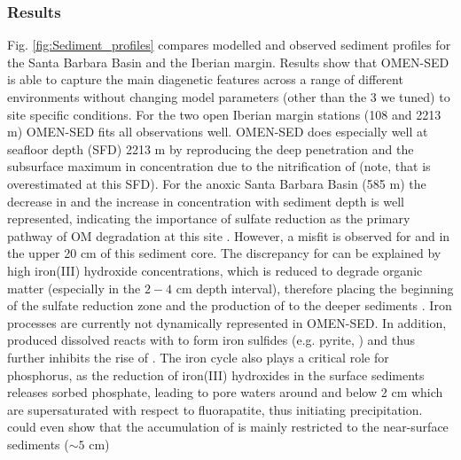 \documentclass[gmd, manuscript]{copernicus}
\begin{document}
\subsubsection{Results}
Fig. \ref{fig:Sediment_profiles} compares modelled and observed sediment profiles for the Santa Barbara Basin and the Iberian margin. Results show 
that OMEN-SED is able to capture the main diagenetic features across a range of different environments without changing model parameters (other than the 3 we tuned) %
to site specific conditions. 
For the two open Iberian margin stations (108 and 2213 m) OMEN-SED fits all observations well. OMEN-SED does especially well at seafloor depth (SFD) 2213 m by reproducing the deep  penetration and the subsurface maximum in  
concentration due to the nitrification of  (note, that  is overestimated at this SFD). 
For the anoxic Santa Barbara Basin (585 m) the decrease in  and the increase in  concentration with sediment depth is well represented, indicating the 
importance of sulfate reduction as the primary pathway of OM degradation at this site \citep[compare with][]{meysman_reactive_2003}. 
However, a misfit is observed for  and  in the upper 20 cm of this sediment core. The discrepancy for  can be explained by high iron(III) hydroxide concentrations, 
which is reduced to degrade organic matter (especially in the $2-4$ cm depth interval), therefore placing the beginning of the sulfate reduction zone and the production of  to the deeper sediments \citep{reimers_porewater_1996}. 
Iron processes are currently not dynamically represented in OMEN-SED. 
In addition, produced dissolved  reacts with  to form iron sulfides (e.g. pyrite, ) and thus further inhibits the rise of  \citep{reimers_seasonal_1990}. 
The iron cycle also plays a critical role for phosphorus, as the reduction of iron(III) hydroxides in the surface sediments releases sorbed phosphate, leading to pore waters around and below 2 cm which are supersaturated with 
respect to fluorapatite, thus initiating  precipitation. \citet{reimers_porewater_1996} could even show that the accumulation of  is mainly restricted to the near-surface sediments ($\sim 5$ cm) 
\end{document}
